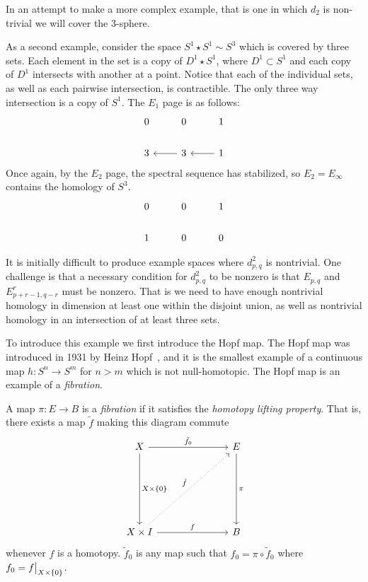 In an attempt to make a more complex example, that is one in which $d_2$ is non-trivial we will cover the 3-sphere.
\begin{example}
As a second example, consider the space $S^1 \star S^1 \sim S^3$ which is covered by three sets. Each element in the set is a copy of $D^1 \star S^1$, where $D^1 \subset S^1$ and each copy of $D^1$ intersects with another at a point. Notice that each of the individual sets, as well as each pairwise intersection, is contractible. The only three way intersection is a copy of $S^1$. The $E_1$ page is as follows:
\[ \begin{tikzcd}
0    &  0     &   1   \\
3    & \arrow{l} 3     & \arrow{l}   1
\end{tikzcd} \]
Once again, by the $E_2$ page, the spectral sequence has stabilized, so $E_2 = E_\infty$ contains the homology of $S^3$.
\[  \begin{tikzcd}
0    &  0     &   1   \\
1    &  0     &   0
\end{tikzcd}
\]
\end{example}
It is initially difficult to produce example spaces where $d^2_{p,q}$ is nontrivial. One challenge is that a necessary condition for $d^2_{p,q}$ to be nonzero is that $E_{p,q}$ and $E^r_{p+r-1, q-r}$ must be nonzero. That is we need to have enough nontrivial homology in dimension at least one within the disjoint union, as well as nontrivial homology in an intersection of at least three sets. 

To introduce this example we first introduce the Hopf map. The Hopf map was introduced  in 1931 by Heinz Hopf~\cite{hopf}, and it is the smallest example of a continuous map $h : S^n \rightarrow S^m$ for $n > m$ which is not null-homotopic. The Hopf map is an example of a \emph{fibration}.
\begin{definition}
A map $\pi: E \rightarrow B$ is a \emph{fibration} if it satisfies the \emph{homotopy lifting property}.
That is, there exists a map $\tilde{f}$ making this diagram commute
\[ \begin{tikzcd}[column sep=1in,row sep=1in]
X \arrow{d}{X \times \{0\}} \arrow{r}{\tilde{f}_0} & E \arrow{d}{\pi} \\
X \times I  \arrow{r}{f} \arrow[dotted]{ur}{\tilde{f}} & B
\end{tikzcd} \]
whenever $f$ is a homotopy. $\tilde{f}_0$ is any map such that $f_0 = \pi \circ \tilde{f}_0$ where $f_0 = \restr{f}{X \times \{0\}}$.
\end{definition}	

